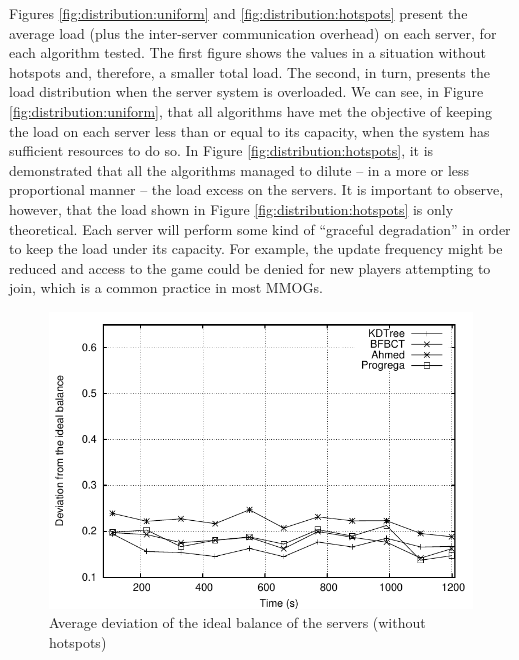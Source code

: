 \documentclass[acmtocl]{acmtrans2m}
\begin{document}
Figures \ref{fig:distribution:uniform} and \ref{fig:distribution:hotspots} present the average load (plus the inter-server communication overhead) on each server, for each algorithm tested. The first figure shows the values in a situation without hotspots and, therefore, a smaller total load. The second, in turn, presents the load distribution when the server system is overloaded. We can see, in Figure \ref{fig:distribution:uniform}, that all algorithms have met the objective of keeping the load on each server less than or equal to its capacity, when the system has sufficient resources to do so. In Figure \ref{fig:distribution:hotspots}, it is demonstrated that all the algorithms managed to dilute -- in a more or less proportional manner -- the load excess on the servers. It is important to observe, however, that the load shown in Figure \ref{fig:distribution:hotspots} is only theoretical. Each server will perform some kind of ``graceful degradation'' in order to keep the load under its capacity. For example, the update frequency might be reduced and access to the game could be denied for new players attempting to join, which is a common practice in most MMOGs.

\begin{figure}[!t]
	\centering
	\includegraphics[width=\linewidth]{images/usagedeviation_uniform}
	\caption{Average deviation of the ideal balance of the servers (without hotspots)}
	\label{fig:usagedeviation:uniform}
\end{figure}
\end{document}
